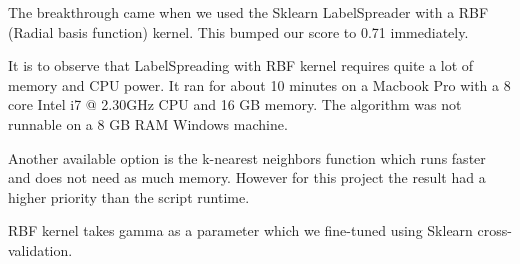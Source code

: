 \documentclass[a4paper, 11pt]{article}
\begin{document}
The breakthrough came when we used the Sklearn LabelSpreader with a
RBF (Radial basis function) kernel. This bumped our score to 0.71 immediately.

It is to observe that LabelSpreading with RBF kernel requires
quite a lot of memory and CPU power. It ran for about 10 minutes
on a Macbook Pro with a 8 core Intel i7 @ 2.30GHz CPU and 16 GB memory.
The algorithm was not runnable on a 8 GB RAM Windows machine.

Another available option is the k-nearest neighbors function which
runs faster and does not need as much memory. However for this project the result had a higher priority than the script runtime.

RBF kernel takes gamma as a parameter which we fine-tuned using Sklearn cross-validation.
\end{document}
